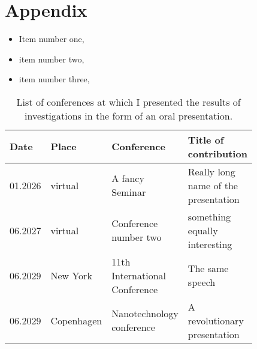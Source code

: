 \chapter*{Appendix}

\lipsum[1]

\begin{itemize}
	\item Item number one, 
	\item item number two, 
	\item item number three, 
\end{itemize}

\lipsum[3]
\vspace{7pt}
\begin{table}[!h]
	\centering
	\caption{List of conferences at which I presented the results of investigations in the form of an oral presentation. }
	\label{conferences} 
	\vspace{-5pt}
	\begin{tabular}{@{}lp{0.12\linewidth}p{0.25\linewidth}p{0.45\linewidth}@{}}
		\doublerule
		Date             & Place               & Conference                                                                                     & Title of contribution                                                                                                                         \\ \midrule
		01.2026     & virtual   & A fancy Seminar                                                  & Really long name of the presentation \\
		06.2027     & virtual   &  Conference  number two                                               & something equally interesting               \\
		06.2029     & New York   & 11th International Conference                                                   & The same speech   \\
		06.2029     & Copenhagen   & Nanotechnology conference          & A revolutionary presentation       \\
		\bottomrule 
	\end{tabular}
\end{table}








